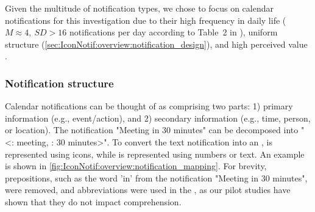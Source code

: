 Given the multitude of notification types, we chose to focus on calendar notifications for this investigation due to their high frequency in daily life ($M \approx{} 4,\: SD > 16$ notifications per day according to Table~2 in \cite{sahami_shirazi_large_scale_2014}), uniform structure (\autoref{sec:IconNotif:overview:notification_design}), and high perceived value \cite{tungare_exploratory_2008, kelley_how_1982, sahami_shirazi_large_scale_2014}.



\subsubsection*{Notification structure}
\label{sec:IconNotif:overview:notification_design}

Calendar notifications can be thought of as comprising two parts: 1) primary information (e.g., event/action), and 2) secondary information (e.g., time, person, or location). The notification "Meeting in 30 minutes" can be decomposed into "<\primaryinfo{}: meeting, \secondaryinfo{}: 30 minutes>". To convert the text notification into an \iconnotif{}, \primaryinfo{} is represented using icons, while \secondaryinfo{} is represented using numbers or text. An example is shown in \autoref{fig:IconNotif:overview:notification_mapping}.
For brevity, prepositions, such as the word 'in' from the notification "Meeting in 30 minutes", were removed, and abbreviations were used in the \iconnotif{}, as our pilot studies have shown that they do not impact comprehension.

